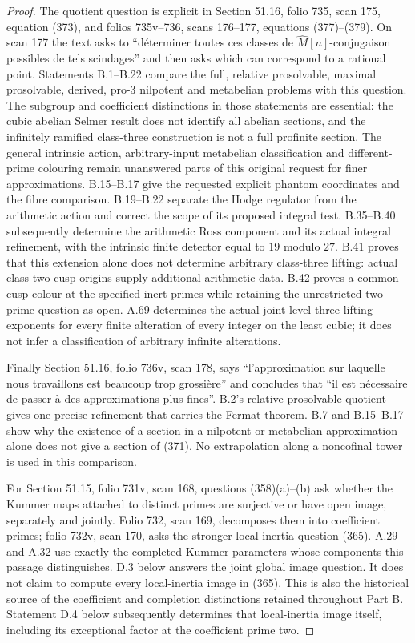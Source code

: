 \begin{proof}
The quotient question is explicit in Section 51.16, folio 735, scan 175,
equation (373), and folios 735v--736, scans 176--177, equations (377)--(379).
On scan 177 the text asks to ``d\'eterminer toutes ces classes de
$\widehat M[n]$-conjugaison possibles de tels scindages'' and then asks
which can correspond to a rational point. Statements B.1--B.22 compare
the full, relative prosolvable, maximal prosolvable, derived, pro-$3$
nilpotent and metabelian problems with this question. The subgroup and
coefficient distinctions in those statements are essential: the cubic
abelian Selmer result does not identify all abelian sections, and the
infinitely ramified class-three construction is not a full profinite
section. The general intrinsic action, arbitrary-input metabelian
classification and different-prime colouring remain unanswered parts
of this original request for finer approximations. B.15--B.17 give the requested explicit
phantom coordinates and the fibre comparison. B.19--B.22 separate the
Hodge regulator from the arithmetic action and correct the scope of its
proposed integral test. B.35--B.40 subsequently determine the arithmetic
Ross component and its actual integral refinement, with the intrinsic
finite detector equal to $19$ modulo $27$.
B.41 proves that this extension alone does not determine arbitrary
class-three lifting: actual class-two cusp origins supply additional
arithmetic data. B.42 proves a common cusp colour at the specified inert
primes while retaining the unrestricted two-prime question as open.
A.69 determines the actual joint level-three lifting exponents for
every finite alteration of every integer on the least cubic; it does
not infer a classification of arbitrary infinite alterations.

Finally Section 51.16, folio 736v, scan 178, says
``l'approximation sur laquelle nous travaillons est beaucoup trop
grossi\`ere'' and concludes that ``il est n\'ecessaire de passer \`a des
approximations plus fines''. B.2's relative prosolvable quotient gives one
precise refinement that carries the Fermat theorem. B.7 and B.15--B.17
show why the existence of a section in a nilpotent
or metabelian approximation alone does not give a section of (371).
No extrapolation along a noncofinal tower is used in this comparison.

For Section 51.15, folio 731v, scan 168, questions (358)(a)--(b) ask whether
the Kummer maps attached to distinct primes are surjective or have open
image, separately and jointly. Folio 732, scan 169, decomposes them into
coefficient primes; folio 732v, scan 170, asks the stronger local-inertia
question (365). A.29 and A.32 use exactly the completed Kummer parameters
whose components this passage distinguishes. D.3 below answers the joint
global image question. It does not claim to compute every local-inertia
image in (365). This is also the historical source of the coefficient and
completion distinctions retained throughout Part B.
Statement D.4 below subsequently determines that local-inertia image
itself, including its exceptional factor at the coefficient prime two.


\end{proof}
